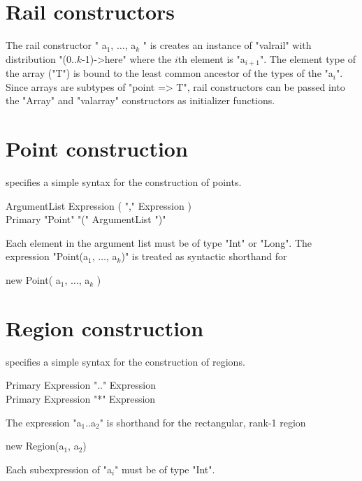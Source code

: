 \section{Rail constructors}

The rail constructor \xcdmath"{ a$_1$, $\dots$, a$_k$ }"
is creates an instance of \xcd"valrail" with distribution
\xcdmath"(0..$k$-1)->here" where the $i$th element is
\xcdmath"a$_{i+1}$".  The element type of the array (\xcd"T") is
bound to the least common ancestor of the types of the
\xcdmath"a$_i$".  Since arrays are subtypes of \xcd"point => T",
rail constructors can be passed into the \xcd"Array" and
\xcd"valarray" constructors as initializer functions.

\section{Point construction}\label{point-syntax}

\Xten{} specifies a simple syntax for the construction of points.

\begin{grammar}
ArgumentList \: Expression ( \xcd"," Expression )\star \\
Primary \: \xcd"Point" \xcd"(" ArgumentList \xcd")"
\end{grammar}

Each element in the argument list must be of type
\xcd"Int" or \xcd"Long".  The expression
\xcdmath"Point(a$_1$, $\dots$, a$_k$)" is treated as syntactic shorthand for
\begin{xtenmath}
new Point({ a$_1$, $\dots$, a$_k$ })
\end{xtenmath}

\section{Region construction}\label{region-syntax}

\Xten{} specifies a simple syntax for the construction of regions.

\begin{grammar}
Primary \: Expression \xcd".." Expression \\
Primary \: Expression \xcd"*" Expression \\
\end{grammar}

The expression \xcdmath"a$_1$..a$_2$"
is shorthand for the rectangular, rank-1 region
\begin{xten}
new Region(a$_1$, a$_2$)
\end{xten}
Each subexpression of \xcdmath"a$_i$" must be of type \xcd"Int".

